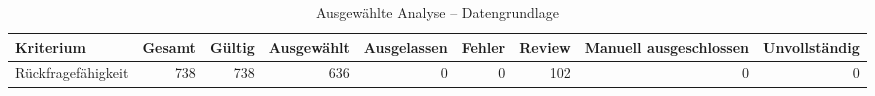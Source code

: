 \begin{table}[htbp]
\centering
\caption{Ausgewählte Analyse -- Datengrundlage}
\begin{tabular}{lrrrrrrrr}
\toprule
Kriterium & Gesamt & Gültig & Ausgewählt & Ausgelassen & Fehler & Review & Manuell ausgeschlossen & Unvollständig \\
\midrule
Rückfragefähigkeit & 738 & 738 & 636 & 0 & 0 & 102 & 0 & 0 \\
\bottomrule
\end{tabular}
\end{table}
